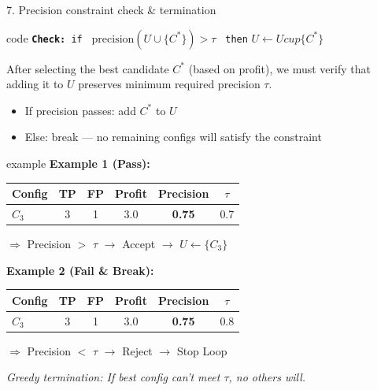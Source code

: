\documentclass[8pt]{beamer} %
\begin{document}
\begin{frame}{7. Precision constraint check \& termination}
	
	\begin{beamercolorbox}[rounded=true, shadow=true, leftskip=1em, rightskip=1em]{code}	
	\texttt{\textbf{Check:} if } $\text{precision}(U \cup \{C^*\}) > \tau$ \texttt{ then}  
	\quad \texttt{$U \leftarrow U cup \{C^*\}$}
	\end{beamercolorbox}
	
	\vspace{0.5em}
	After selecting the best candidate $C^*$ (based on profit), we must verify that adding it to $U$ preserves minimum required precision $\tau$.
	
	\begin{itemize}
		\item If precision passes: add $C^*$ to $U$
		\item Else: break — no remaining configs will satisfy the constraint
	\end{itemize}
	
	\vspace{1em}
	\begin{beamercolorbox}[rounded=true, shadow=true, leftskip=1em, rightskip=1em]{example}		
	\textbf{Example 1 (Pass):}
	\begin{tabular}{lccccc}
		Config & TP & FP & Profit & Precision & $\tau$ \\
		\hline
		$C_3$ & 3 & 1 & 3.0 & \textbf{0.75} & 0.7 \\
	\end{tabular}
	
	\vspace{0.5em}
	$\Rightarrow$ Precision $>$ $\tau$ $\rightarrow$ Accept $\rightarrow$ $U \leftarrow \{C_3\}$
	
	\vspace{1em}
	\textbf{Example 2 (Fail \& Break):}
	\begin{tabular}{lccccc}
		Config & TP & FP & Profit & Precision & $\tau$ \\
		\hline
		$C_3$ & 3 & 1 & 3.0 & \textbf{0.75} & 0.8 \\
	\end{tabular}
	
	\vspace{0.5em}
	$\Rightarrow$ Precision $<$ $\tau$ $\rightarrow$ Reject $\rightarrow$ Stop Loop
	\end{beamercolorbox}

	\vspace{0.5em}

	
	\textit{Greedy termination: If best config can’t meet $\tau$, no others will.}
\end{frame}
\end{document}
